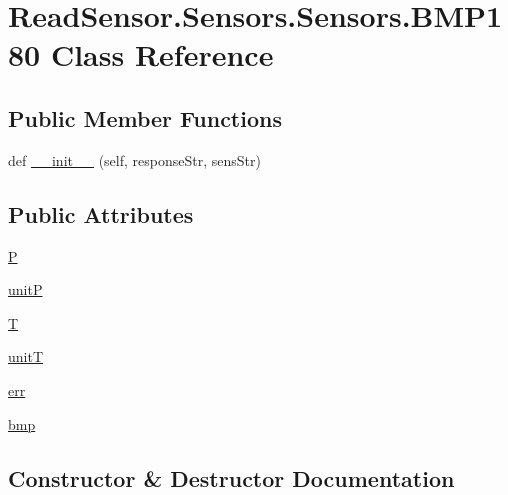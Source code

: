 \hypertarget{classReadSensor_1_1Sensors_1_1Sensors_1_1BMP180}{}\section{Read\+Sensor.\+Sensors.\+Sensors.\+B\+M\+P180 Class Reference}
\label{classReadSensor_1_1Sensors_1_1Sensors_1_1BMP180}
\subsection*{Public Member Functions}
\begin{DoxyCompactItemize}
\item 
def \hyperlink{classReadSensor_1_1Sensors_1_1Sensors_1_1BMP180_ab2e2524391f73ec0d30d410fadd0a652}{\+\_\+\+\_\+init\+\_\+\+\_\+} (self, response\+Str, sens\+Str)
\end{DoxyCompactItemize}
\subsection*{Public Attributes}
\begin{DoxyCompactItemize}
\item 
\hyperlink{classReadSensor_1_1Sensors_1_1Sensors_1_1BMP180_a3c5e2dce2dbf36b6bf58ce03fe9f9760}{P}
\item 
\hyperlink{classReadSensor_1_1Sensors_1_1Sensors_1_1BMP180_a1255570ce7a030cd3b8107a7c030689d}{unitP}
\item 
\hyperlink{classReadSensor_1_1Sensors_1_1Sensors_1_1BMP180_afe368d14fb56949c6807490f5f98598f}{T}
\item 
\hyperlink{classReadSensor_1_1Sensors_1_1Sensors_1_1BMP180_aba2f27830d1c5ebb2bbd489b85a20e63}{unitT}
\item 
\hyperlink{classReadSensor_1_1Sensors_1_1Sensors_1_1BMP180_a628ea789c02ea34753668a4608695e06}{err}
\item 
\hyperlink{classReadSensor_1_1Sensors_1_1Sensors_1_1BMP180_a876011e5f5ba316f75c74f2b1811d878}{bmp}
\end{DoxyCompactItemize}


\subsection{Constructor \& Destructor Documentation}
